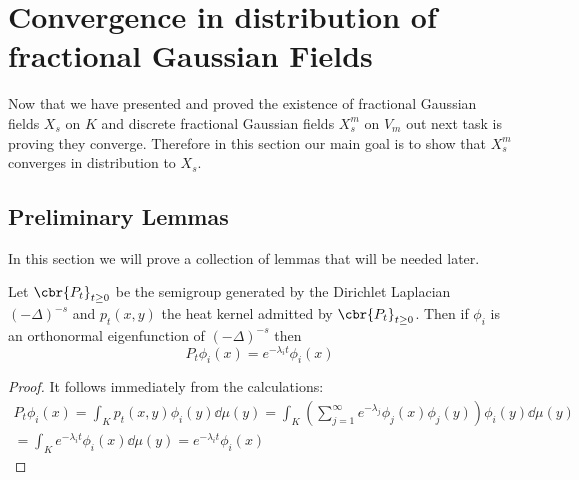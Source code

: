 \chapter{Convergence in distribution of fractional Gaussian Fields}

Now that we have presented and proved the existence of fractional Gaussian fields $X_s$ on $K$ and discrete fractional Gaussian fields $X_s^{m}$ on $V_m$ out next task is proving they converge. Therefore in this section our main goal is to show that $X_s^{m}$ converges in distribution to $X_s$.

\section{Preliminary Lemmas}
In this section we will prove a collection of lemmas that will be needed later.

\begin{lemma}\label{suckItKigami}
	Let $\cbr{P_t}_{t \geq 0}$ be the semigroup generated by the Dirichlet Laplacian $(-\Delta)^{-s}$ and $p_t(x,y)$ the heat kernel admitted by $\cbr{P_t}_{t \geq 0}$. Then if $\phi_i$ is an orthonormal eigenfunction of $(-\Delta)^{-s}$ then
	\begin{equation}
		P_t \phi_i(x) = e^{-\lambda_i t}\phi_i(x)
	\end{equation}
\end{lemma}
\begin{proof}
	 It follows immediately from the calculations:
	\begin{multline}
		P_t \phi_i(x) = \int_{K}p_t(x,y)\phi_i(y) \dd \mu(y) = \int_{K} \left(\sum_{j = 1}^{\infty}e^{-\lambda_j} \phi_j(x)\phi_j(y)\right) \phi_i(y) \dd \mu(y) \\
		= \int_{K} e^{-\lambda_i t}\phi_i(x) \dd \mu(y) = e^{-\lambda_i t}\phi_i(x)
	\end{multline}
\end{proof}

